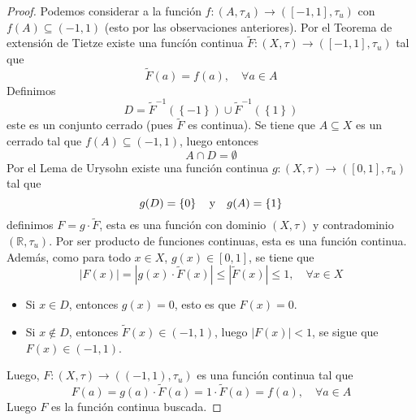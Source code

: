 \documentclass[12pt]{report}
\newcounter{it}
\theoremstyle{largebreak}
\newcommand\abs[1]{\ensuremath{\left|#1\right|}}
\newcommand\cf[3]{\ensuremath{#1:#2\rightarrow#3}}
\begin{document}
    \begin{proof}
        Podemos considerar a la función $\cf{f}{(A,\tau_A)}{([-1,1],\tau_u)}$ con $f(A)\subseteq(-1,1)$ (esto por las observaciones anteriores). Por el Teorema de extensión de Tietze existe una funcíón continua $\cf{\widetilde{F}}{(X,\tau)}{([-1,1],\tau_u)}$ tal que
        \begin{equation*}
            \widetilde{F}(a)=f(a),\quad\forall a\in A
        \end{equation*}
        Definimos
        \begin{equation*}
            D=\widetilde{F}^{-1}(\left\{-1\right\})\cup \widetilde{F}^{-1}(\left\{1\right\})
        \end{equation*}
        este es un conjunto cerrado (pues $\widetilde{F}$ es continua). Se tiene que $A\subseteq X$ es un cerrado tal que $f(A)\subseteq(-1,1)$, luego entonces
        \begin{equation*}
            A\cap D=\emptyset
        \end{equation*}
        Por el Lema de Urysohn existe una función continua $\cf{g}{(X,\tau)}{([0,1],\tau_u)}$ tal que
        \begin{equation*}
            g(D)=\left\{0 \right\}\quad\textup{y}\quad g(A)=\left\{1 \right\}
        \end{equation*}
        definimos $F=g\cdot \widetilde{F}$, esta es una función con dominio $(X,\tau)$ y contradominio $(\mathbb{R},\tau_u)$. Por ser producto de funciones continuas, esta es una función continua. Además, como para todo $x\in X$, $g(x)\in[0,1]$, se tiene que
        \begin{equation*}
            \abs{F(x)}=\abs{g(x)\cdot \widetilde{F}(x)}\leq \abs{\widetilde{F}(x)}\leq 1,\quad\forall x\in X
        \end{equation*}
        \begin{itemize}
            \item Si $x\in D$, entonces $g(x)=0$, esto es que $F(x)=0$.
            \item Si $x\notin D$, entonces $\widetilde{F}(x)\in(-1,1)$, luego $\abs{F(x)}<1$, se sigue que $F(x)\in(-1,1)$.
        \end{itemize}
        Luego, $\cf{F}{(X,\tau)}{((-1,1),\tau_u)}$ es una función continua tal que
        \begin{equation*}
            F(a)=g(a)\cdot \widetilde{F}(a)=1\cdot \widetilde{F}(a)=f(a),\quad\forall a\in A
        \end{equation*}
        Luego $F$ es la función continua buscada.
    \end{proof}
\end{document}
